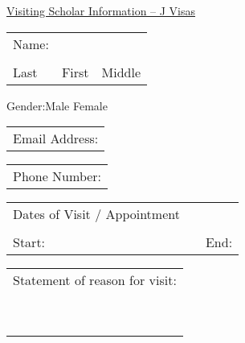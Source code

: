 \documentclass[
  paper=a4,
  fontsize=12pt,
  DIV=16,
  parskip=full,
  headinclude=true,
]{scrartcl}
\begin{document}
  \thispagestyle{empty}

\begin{center}
  \underline{Visiting Scholar Information – J Visas}
\end{center}

\vspace{2em}
\begin{tabular}{@{}p{}@{}p{}@{}p{}}
  Name: & & \\
  & & \\
  Last \hrulefill \quad & First \hrulefill \quad & Middle \hrulefill \\
\end{tabular}

\vspace{2em}
Gender:\quad Male\underline{\hspace{3cm}} \quad Female\underline{\hspace{3cm}}

\vspace{2em}
\begin{tabular}{@{}p{\textwidth}}
  Email Address:\quad \hrulefill \\
\end{tabular}

\vspace{2em}
\begin{tabular}{@{}p{\textwidth}}
  Phone Number: \quad \hrulefill \\
\end{tabular}

\vspace{2em}
\begin{tabular}{@{}p{5cm}@{}p{1em}@{}p{5cm}}
  Dates of Visit / Appointment & & \\
  & & \\
  Start: \hrulefill & & End: \hrulefill \\
\end{tabular}

\vspace{2em}
\begin{tabular}{@{}p{\textwidth}}
  Statement of reason for visit: \\ \\
  \hrulefill \\ \\
  \hrulefill \\ \\
  \hrulefill \\ \\
  \hrulefill \\ \\
\end{tabular}
\end{document}
